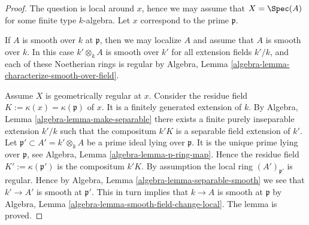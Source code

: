 \begin{proof}
The question is local around $x$,
hence we may assume that $X = \Spec(A)$
for some finite type $k$-algebra.
Let $x$ correspond to the prime $\mathfrak p$.

\medskip\noindent
If $A$ is smooth over $k$ at $\mathfrak p$, then we may localize $A$
and assume that $A$ is smooth over $k$. In this case $k' \otimes_k A$
is smooth over $k'$ for all extension fields $k'/k$, and each of
these Noetherian rings is regular by
Algebra, Lemma \ref{algebra-lemma-characterize-smooth-over-field}.

\medskip\noindent
Assume $X$ is geometrically regular at $x$.
Consider the residue field $K := \kappa(x) = \kappa(\mathfrak p)$ of $x$.
It is a finitely generated extension of $k$.
By Algebra, Lemma \ref{algebra-lemma-make-separable}
there exists a finite purely inseparable
extension $k'/k$ such that the compositum
$k'K$ is a separable field extension of $k'$.
Let $\mathfrak p' \subset A' = k' \otimes_k A$ be a prime ideal
lying over $\mathfrak p$. It is the unique prime lying over $\mathfrak p$, see
Algebra, Lemma \ref{algebra-lemma-p-ring-map}.
Hence the residue field $K' := \kappa(\mathfrak p')$
is the compositum $k'K$. By assumption the local ring
$(A')_{\mathfrak p'}$ is regular. Hence by
Algebra, Lemma \ref{algebra-lemma-separable-smooth}
we see that $k' \to A'$ is smooth at $\mathfrak p'$.
This in turn implies that $k \to A$ is smooth at $\mathfrak p$ by
Algebra, Lemma \ref{algebra-lemma-smooth-field-change-local}.
The lemma is proved.
\end{proof}


